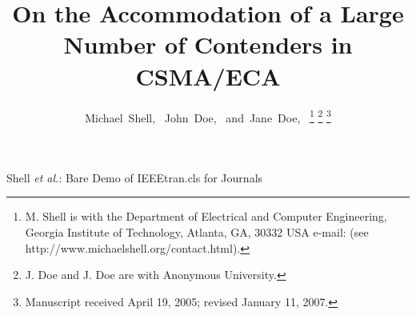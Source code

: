 \documentclass[journal]{IEEEtran}
\begin{document}
%
\title{On the Accommodation of a Large Number of Contenders in CSMA/ECA}
%
%
%

\author{Michael~Shell,~
        John~Doe,~
        and~Jane~Doe,~%
\thanks{M. Shell is with the Department
of Electrical and Computer Engineering, Georgia Institute of Technology, Atlanta,
GA, 30332 USA e-mail: (see http://www.michaelshell.org/contact.html).}%
\thanks{J. Doe and J. Doe are with Anonymous University.}%
\thanks{Manuscript received April 19, 2005; revised January 11, 2007.}}

% 
%



%
{Shell \MakeLowercase{\textit{et al.}}: Bare Demo of IEEEtran.cls for Journals}
% 
\end{document}
